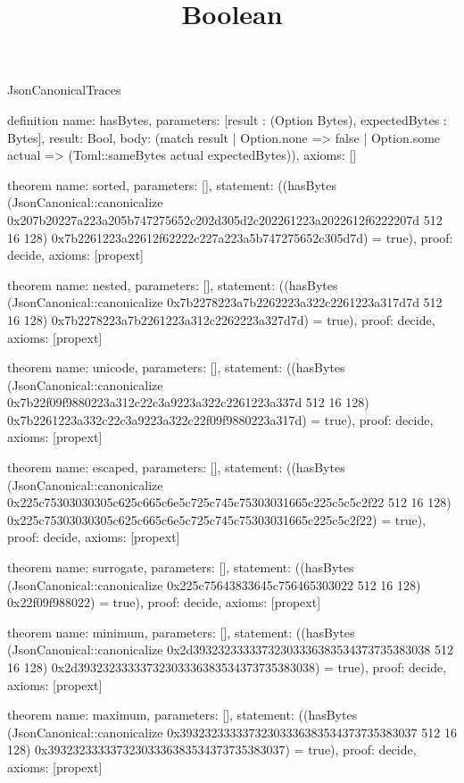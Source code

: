 \begin{lexlean}{JsonCanonicalTraces}
\title{Boolean}
\begin{semanticmodule}

definition{
 name: hasBytes,
 parameters: [result : (Option Bytes), expectedBytes : Bytes],
 result: Bool,
 body: (match result | Option.none => false | Option.some actual => (Toml::sameBytes actual expectedBytes)),
 axioms: []
}

theorem{
 name: sorted,
 parameters: [],
 statement: ((hasBytes (JsonCanonical::canonicalize 0x207b20227a223a205b747275652c202d305d2c202261223a2022612f6222207d 512 16 128) 0x7b2261223a22612f62222c227a223a5b747275652c305d7d) = true),
 proof: decide{},
 axioms: [propext]
}

theorem{
 name: nested,
 parameters: [],
 statement: ((hasBytes (JsonCanonical::canonicalize 0x7b2278223a7b2262223a322c2261223a317d7d 512 16 128) 0x7b2278223a7b2261223a312c2262223a327d7d) = true),
 proof: decide{},
 axioms: [propext]
}

theorem{
 name: unicode,
 parameters: [],
 statement: ((hasBytes (JsonCanonical::canonicalize 0x7b22f09f9880223a312c22c3a9223a322c2261223a337d 512 16 128) 0x7b2261223a332c22c3a9223a322c22f09f9880223a317d) = true),
 proof: decide{},
 axioms: [propext]
}

theorem{
 name: escaped,
 parameters: [],
 statement: ((hasBytes (JsonCanonical::canonicalize 0x225c75303030305c625c665c6e5c725c745c75303031665c225c5c5c2f22 512 16 128) 0x225c75303030305c625c665c6e5c725c745c75303031665c225c5c2f22) = true),
 proof: decide{},
 axioms: [propext]
}

theorem{
 name: surrogate,
 parameters: [],
 statement: ((hasBytes (JsonCanonical::canonicalize 0x225c75643833645c756465303022 512 16 128) 0x22f09f988022) = true),
 proof: decide{},
 axioms: [propext]
}

theorem{
 name: minimum,
 parameters: [],
 statement: ((hasBytes (JsonCanonical::canonicalize 0x2d39323233333732303336383534373735383038 512 16 128) 0x2d39323233333732303336383534373735383038) = true),
 proof: decide{},
 axioms: [propext]
}

theorem{
 name: maximum,
 parameters: [],
 statement: ((hasBytes (JsonCanonical::canonicalize 0x39323233333732303336383534373735383037 512 16 128) 0x39323233333732303336383534373735383037) = true),
 proof: decide{},
 axioms: [propext]
}


\end{semanticmodule}
\end{lexlean}
